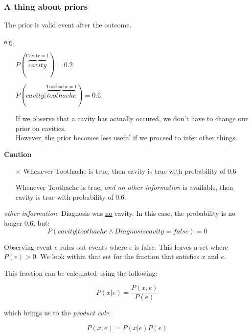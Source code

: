 \begin{frame}\frametitle{A thing about priors}

The prior is valid event after the outcome.

e.g.\\
\begin{itemize}
 \item[] $P(\overbrace{cavity}^{\text{Cavity}=1}) = 0.2$
 \item[] $P(cavity | \overbrace{toothache}^{\text{Toothache}=1}) = 0.6$
 \item[] If we observe that a cavity has actually occured, we don't have to change our prior on cavities.\\
 However, the prior becomes less useful if we proceed to infer other things.
\end{itemize}
    
\textbf{Caution}\\
\begin{itemize}
\item[$\times$] Whenever Toothache is true, then cavity is true with probability of 0.6
\item[\checkmark] Whenever Toothache is true, \textit{and no other information} is available, then cavity is true with probability of 0.6.
\end{itemize}

\textit{other information}: Diagnosis was \underline{no} cavity. In this case, the probability is no longer 0.6, but:
\begin{equation}
P(cavity | toothache \wedge Diagnosis cavity = false) = 0
\end{equation}

\end{frame}

Observing event $e$ rules out events where e is false. This leaves a set where $P(e)>0$.
We look within that set for the fraction that satisfies $x$ and $e$.

This fraction can be calculated using the following:

\begin{equation}
P(x|e) = \frac{P(x,e)}{P(e)}
\end{equation}

which brings us to the \emph{product rule}:

\begin{equation}
P(x,e) = P(x|e) P(e)
\label{eq:productrule}    
\end{equation}


